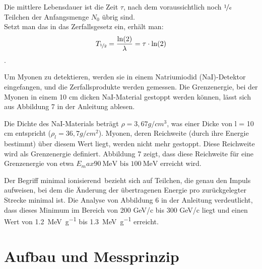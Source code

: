 \documentclass[12pt,a4paper,ngerman]{report}
\begin{document}
		Die mittlere Lebensdauer ist die Zeit $\tau$, nach dem voraussichtlich noch $\nicefrac{1}{e}$ Teilchen der Anfangsmenge $N_0$ übrig sind. \\
		Setzt man das in das Zerfallsgesetz ein, erhält man:
		\[T_{\nicefrac{1}{2}} = \frac{\ln(2)}{\lambda} = \tau \cdot \ln(2) \].
		
		Um Myonen zu detektieren, werden sie in einem Natriumiodid (NaI)-Detektor eingefangen, und die Zerfallsprodukte werden gemessen. Die Grenzenergie, bei der Myonen in einem 10 cm dicken NaI-Material gestoppt werden können, lässt sich aus Abbildung 7 in der Anleitung  \cite{Anleitung} ablesen.
		
		Die Dichte des NaI-Materials beträgt $\rho = 3,67 g/cm^3$, was einer Dicke von l = 10 cm entspricht ($\rho_l = 36,7 g/cm^2$). Myonen, deren Reichweite (durch ihre Energie bestimmt) über diesem Wert liegt, werden nicht mehr gestoppt. Diese Reichweite wird als Grenzenergie definiert. Abbildung 7 zeigt, dass diese Reichweite für eine Grenzenergie von etwa $E_max  \qty{90}{\mega\electronvolt} \text{ bis } \qty{100}{\mega\electronvolt}$ erreicht wird.
		
		Der Begriff \glqq minimal ionisierend\grqq ~bezieht sich auf Teilchen, die genau den Impuls aufweisen, bei dem die Änderung der übertragenen Energie pro zurückgelegter Strecke minimal ist. Die Analyse von Abbildung 6 in der Anleitung verdeutlicht, dass dieses Minimum im Bereich von 200 GeV/c bis 300 GeV/c liegt und einen Wert von \qty{1,2}{\mega \electronvolt\per\gram} bis \qty{1,3}{\mega \electronvolt\per\gram} erreicht.
		

\chapter{Aufbau und Messprinzip}
\end{document}
